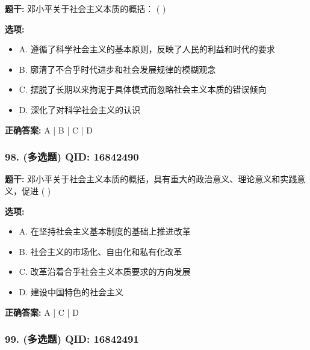\documentclass[12pt,UTF8]{ctexart}
\begin{document}
\textbf{题干:}
邓小平关于社会主义本质的概括： ( )

\textbf{选项:}
\begin{itemize}[leftmargin=*]

  \item A. 遵循了科学社会主义的基本原则，反映了人民的利益和时代的要求

  \item B. 廓清了不合乎时代进步和社会发展规律的模糊观念

  \item C. 摆脱了长期以来拘泥于具体模式而忽略社会主义本质的错误倾向

  \item D. 深化了对科学社会主义的认识

\end{itemize}

\textbf{正确答案:}
A | B | C | D

\vspace{0.3em}\hrulefill\vspace{0.7em}

\subsubsection*{98. (多选题) \small QID: 16842490}

\textbf{题干:}
邓小平关于社会主义本质的概括，具有重大的政治意义、理论意义和实践意义，促进 ( )

\textbf{选项:}
\begin{itemize}[leftmargin=*]

  \item A. 在坚持社会主义基本制度的基础上推进改革

  \item B. 社会主义的市场化、自由化和私有化改革

  \item C. 改革沿着合乎社会主义本质要求的方向发展

  \item D. 建设中国特色的社会主义

\end{itemize}

\textbf{正确答案:}
A | C | D

\vspace{0.3em}\hrulefill\vspace{0.7em}

\subsubsection*{99. (多选题) \small QID: 16842491}
\end{document}
